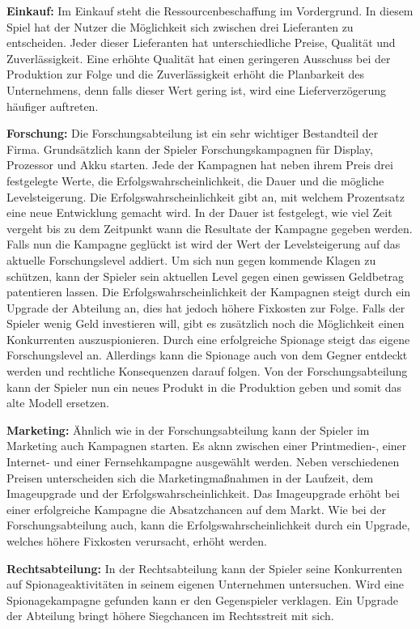 \textbf{Einkauf:} 
Im Einkauf steht die Ressourcenbeschaffung im Vordergrund. In diesem Spiel hat der Nutzer die Möglichkeit sich zwischen drei Lieferanten zu entscheiden. Jeder dieser Lieferanten hat unterschiedliche Preise, Qualität und Zuverlässigkeit. Eine erhöhte Qualität hat einen geringeren Ausschuss bei der Produktion zur Folge und die Zuverlässigkeit erhöht die Planbarkeit des Unternehmens, denn falls dieser Wert gering ist, wird eine Lieferverzögerung häufiger auftreten.

\textbf{Forschung:} 
Die Forschungsabteilung ist ein sehr wichtiger Bestandteil der Firma. Grundsätzlich kann der Spieler Forschungskampagnen für Display, Prozessor und Akku starten. Jede der Kampagnen hat neben ihrem Preis drei festgelegte Werte, die Erfolgswahrscheinlichkeit, die Dauer und die mögliche Levelsteigerung. Die Erfolgswahrscheinlichkeit gibt an, mit welchem Prozentsatz eine neue Entwicklung gemacht wird. In der Dauer ist festgelegt, wie viel Zeit vergeht bis zu dem Zeitpunkt wann die Resultate der Kampagne gegeben werden. Falls nun die Kampagne geglückt ist wird der Wert der Levelsteigerung auf das aktuelle Forschungslevel addiert. Um sich nun gegen kommende Klagen zu schützen, kann der Spieler sein aktuellen Level gegen einen gewissen Geldbetrag patentieren lassen. Die Erfolgswahrscheinlichkeit der Kampagnen steigt durch ein Upgrade der Abteilung an, dies hat jedoch höhere Fixkosten zur Folge. Falls der Spieler wenig Geld investieren will, gibt es zusätzlich noch die Möglichkeit einen Konkurrenten auszuspionieren. Durch eine erfolgreiche Spionage steigt das eigene Forschungslevel an. Allerdings kann die Spionage auch von dem Gegner entdeckt werden und rechtliche Konsequenzen darauf folgen. Von der Forschungsabteilung kann der Spieler nun ein neues Produkt in die Produktion geben und somit das alte Modell ersetzen.

\textbf{Marketing: }
Ähnlich wie in der Forschungsabteilung kann der Spieler im Marketing auch Kampagnen starten. Es aknn zwischen einer Printmedien-, einer Internet- und einer Fernsehkampagne ausgewählt werden. Neben verschiedenen Preisen unterscheiden sich die Marketingmaßnahmen in der Laufzeit, dem Imageupgrade und der Erfolgswahrscheinlichkeit. Das Imageupgrade erhöht bei einer erfolgreiche Kampagne die Absatzchancen auf dem Markt. Wie bei der Forschungsabteilung auch, kann die Erfolgswahrscheinlichkeit durch ein Upgrade, welches höhere Fixkosten verursacht, erhöht werden.

\textbf{Rechtsabteilung:} 
In der Rechtsabteilung kann der Spieler seine Konkurrenten auf Spionageaktivitäten in seinem eigenen Unternehmen untersuchen. Wird eine Spionagekampagne gefunden kann er den Gegenspieler verklagen. Ein Upgrade der Abteilung bringt höhere Siegchancen im Rechtsstreit mit sich.

